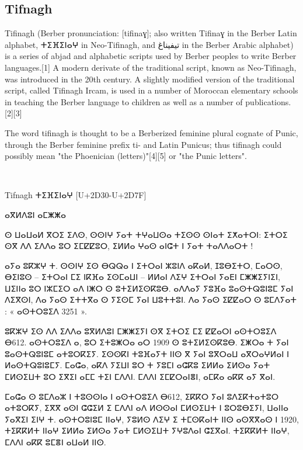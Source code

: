 \subsection{Tifnagh}

\newfontfamily{}

Tifinagh (Berber pronunciation: [tifinaɣ]; also written Tifinaɣ in the Berber Latin alphabet, {\tifinagh  ⵜⵉⴼⵉⵏⴰⵖ} in Neo-Tifinagh, and تيفيناغ in the Berber Arabic alphabet) is a series of abjad and alphabetic scripts used by Berber peoples to write Berber languages.[1]
A modern derivate of the traditional script, known as Neo-Tifinagh, was introduced in the 20th century. A slightly modified version of the traditional script, called Tifinagh Ircam, is used in a number of Moroccan elementary schools in teaching the Berber language to children as well as a number of publications.[2][3]

The word tifinagh is thought to be a Berberized feminine plural cognate of Punic, through the Berber feminine prefix ti- and Latin Punicus; thus tifinagh could possibly mean "the Phoenician (letters)"[4][5] or "the Punic letters".

\bgroup

\noindent\tifinagh
\colorbox{graphicbackground}{\color{black}^^A
\begin{minipage}{\textwidth}
\parindent1pt
\vskip10pt
 \rightskip\leftskip
Tifnagh     ⵜⵉⴼⵉⵏⴰⵖ [U+2D30-U+2D7F]

ⴰⴳⵍⴷⵓⵏ ⴰⵎⵥⵥⴰ

ⵙ ⵡⴰⵡⴰⵍ ⴳⵔⵉ ⵉⴷⵙ, ⵙⵙⵏⵖ ⵢⴰⵜ ⵜⵖⴰⵡⵙⴰ ⵜⵉⵙⵙ ⵙⵏⴰⵜ  ⵉⵅⴰⵜⵔⵏ: ⵉⵜⵔⵉ ⵙⴳ ⴷⴷ ⵉⴷⴷⴰ ⵓⵔ ⵉⵎⵇⵇⵓⵔ, ⵉⵍⵍⴰ ⵖⴰⵙ ⴰⵏⵛⵜ ⵏ ⵢⴰⵜ ⵜⴰⴷⴷⴰⵔⵜ !

ⴰⵢⴰ ⵓⴽⵣⵖ ⵜ. ⵙⵙⵏⵖ ⵉⵙ ⴱⵕⵕⴰ ⵏ ⵉⵜⵔⴰⵏ ⵣⵓⵏⴷ ⴰⴽⴰⵍ, ⵊⵓⴱⵉⵜⵔ, ⵎⴰⵔⵙ, ⴱⵉⵏⵓⵙ – ⵉⵜⵔⴰⵏ ⵎⵉ ⵏⴽⴼⴰ ⵉⵙⵎⴰⵡⵏ – ⵍⵍⴰⵏ ⴷⵉⵖ ⵉⵜⵔⴰⵏ ⵢⴰⴹⵏ ⵎⵥⵥⵉⵢⵏⵉⵏ, ⵡⵉⵏⵏⴰ ⵓⵔ ⵏⵣⵎⵉⵔ ⴰⴷ ⵏⵥⵔ ⵙ ⵓⵜⵉⵍⵉⵙⴽⵓⴱ. ⴰⴷⴷⴰⵢ ⵢⵓⴼⴰ ⵓⴰⵙⵜⵕⵓⵏⵓⵎ ⵢⴰⵏ ⴷⵉⴳⵙⵏ, ⴷⴰ ⵢⴰⵙ ⵉⵜⵜⴳⴰ ⵙ ⵢⵉⵙⵎ ⵢⴰⵏ ⵡⵓⵜⵜⵓⵏ. ⴷⴰ ⵢⴰⵙ ⵉⵇⵇⴰⵔ ⵙ ⵓⵎⴷⵢⴰⵜ : « ⴰⵙⵜⵔⵓⵉⴷ 3251 ».

ⵓⴽⵣⵖ ⵉⵙ ⴷⴷ ⵉⴷⴷⴰ ⵓⴳⵍⴷⵓⵏ ⵎⵥⵥⵉⵢⵏ ⵙⴳ ⵉⵜⵔⵉ ⵎⵉ ⵇⵇⴰⵔⵏ ⴰⵙⵜⵔⵓⵉⴷ ⴱ612. ⴰⵙⵜⵔⵓⵉⴷ ⴰ, ⵓⵔ ⵉⵜⵓⵥⵔⴰ ⴰⵔ 1909 ⵙ ⵓⵜⵉⵍⵉⵙⴽⵓⴱ. ⵉⵥⵔⴰ ⵜ ⵢⴰⵏ ⵓⴰⵙⵜⵕⵓⵏⵓⵎ ⴰⵜⵓⵔⴽⵉⵢ. ⵉⵙⵙⴽⵏ ⵜⵓⴼⴰⵢⵜ ⵏⵏⵙ ⴳ ⵢⴰⵏ ⵓⴳⵔⴰⵡ ⴰⴳⵔⴰⵖⵍⴰⵏ ⵏ ⵍⴰⵙⵜⵕⵓⵏⵓⵎⵢ. ⵎⴰⵛⴰ, ⴰⴽⴷ ⵢⵉⵡⵏ ⵓⵔ ⵜ ⵢⵓⵎⵏ ⴰⵛⴽⵓ ⵉⵍⵍⴰ ⵉⵍⵙⴰ ⵢⴰⵜ ⵎⵍⵙⵉⵡⵜ ⵓⵔ ⵉⴳⵉⵏ ⴰⵎⵎ ⵜⵉⵏ ⵎⴷⴷⵏ. ⵎⴷⴷⵏ ⵉⵎⵇⵔⴰⵏⴻⵏ, ⴰⵎⴽⴰ ⴰⴽⴽ ⴰⵢ ⴳⴰⵏ.

ⵎⴰⵛⴰ ⵙ ⵓⵎⴷⴰⵣ ⵏ ⵜⵓⵙⵙⵏⴰ ⵏ ⴰⵙⵜⵔⵓⵉⴷ ⴱ612, ⵉⴽⴽⵔ ⵢⴰⵏ ⵓⴷⵉⴽⵜⴰⵜⵓⵔ ⴰⵜⵓⵔⴽⵢ, ⵉⴳⴳ ⴰⵙⵏ ⵛⵛⵉⵍ ⵉ ⵎⴷⴷⵏ ⴰⴷ ⵍⵙⵙⴰⵏ ⵎⵍⵙⵉⵡⵜ ⵏ ⵓⵔⵓⴱⵉⵢⵏ, ⵡⴰⵏⵏⴰ ⵢⴰⴳⵉⵏ ⵉⵏⵖ ⵜ. ⴰⵙⵜⵔⵓⵏⵓⵎ ⵏⵏⴰⵖ, ⵢⵓⵍⵙ ⴷⵉⵖ ⵉ ⵜⵎⵙⴽⴰⵏⵜ ⵏⵏⵙ ⴰⵙⴳⴳⴰⵙ ⵏ 1920, ⵜⵉⴽⴽⵍⵜ ⵏⵏⴰⵖ ⵉⵍⵍⴰ ⵉⵍⵙⴰ ⵢⴰⵜ ⵎⵍⵙⵉⵡⵜ ⵢⵖⵓⴷⴰⵏ ⵛⵉⴳⴰⵏ. ⵜⵉⴽⴽⵍⵜ ⵏⵏⴰⵖ, ⵎⴷⴷⵏ ⴰⴽⴽ ⵓⵎⴻⵏ ⴰⵡⴰⵍ ⵏⵏⵙ.
\par
\vspace*{10pt}
\end{minipage}
}
